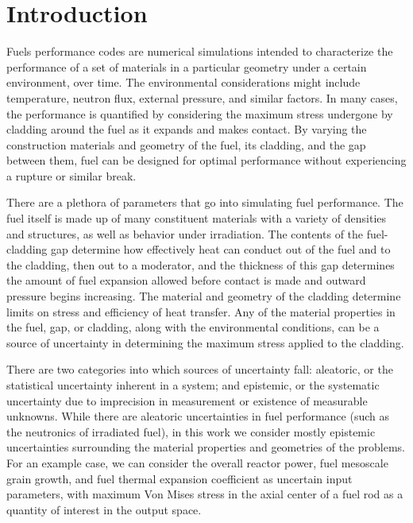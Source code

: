 
\chapter{Introduction} %

\label{Chapter1} %




Fuels performance codes are numerical simulations intended to characterize the performance of a set of
materials in a particular geometry under a certain environment, over time.  The environmental considerations
might include temperature, neutron flux, external pressure, and similar factors.  In many cases, the
performance is quantified by considering the maximum stress undergone by cladding around the fuel as it
expands and makes contact.  By varying the construction materials and geometry of the fuel, its cladding, and
the gap between them, fuel can be designed for optimal performance without experiencing a rupture or similar
break.

There are a plethora of parameters that go into simulating fuel performance.  The fuel itself is made up of
many constituent materials with a variety of densities and structures, as well as behavior under irradiation.
The contents of the fuel-cladding gap determine how effectively heat can conduct out of the fuel and to the
cladding, then out to a moderator, and the thickness of this gap determines the amount of fuel expansion
allowed before contact is made and outward pressure begins increasing.  The material and geometry of the
cladding determine limits on stress and efficiency of heat transfer.  Any of the material properties in the
fuel, gap, or cladding, along with the environmental conditions, can be a source of uncertainty in determining
the maximum stress applied to the cladding.

There are two categories into which sources of uncertainty fall: aleatoric, or the statistical uncertainty inherent in a
system; and epistemic, or the systematic uncertainty due to imprecision in measurement or existence of
measurable unknowns.  While there are aleatoric uncertainties in fuel performance (such as the neutronics of
irradiated fuel), in this work we consider mostly epistemic uncertainties surrounding the material properties
and geometries of the problems.  For an example case, we can consider the overall reactor power, fuel mesoscale
grain growth, and fuel thermal expansion coefficient as uncertain input parameters, with maximum Von Mises stress in the 
axial center of a fuel rod as a quantity of interest in the output space.


